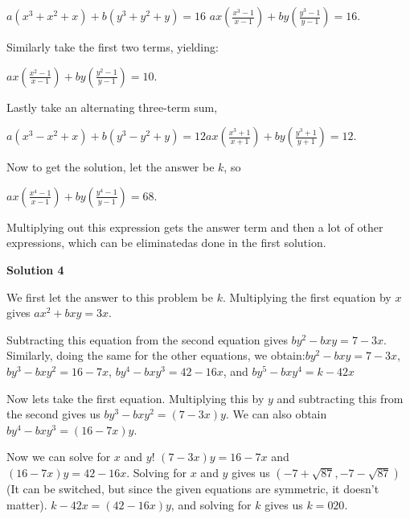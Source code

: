 \begin{enumerate}
 $a(x^3 + x^2 + x) + b(y^3 + y^2 + y) = 16$
$ax\left( \frac{x^3-1}{x-1} \right) + by\left( \frac{y^3-1}{y-1} \right) = 16$.

 Similarly take the first two terms, yielding:

 $ax \left( \frac{x^2-1}{x-1} \right) + by \left( \frac{y^2-1}{y-1} \right) = 10$.

 Lastly take an alternating three-term sum,

 $a(x^3 - x^2 + x) + b(y^3 - y^2 + y) = 12$$ax \left( \frac{x^3+1}{x+1} \right) + by \left( \frac{y^3+1}{y+1} \right) = 12$.

 Now to get the solution, let the answer be $k$, so 

 $ax \left( \frac{x^4-1}{x-1} \right) + by \left(\frac{y^4-1}{y-1} \right) = 68$.

 Multiplying out this expression gets the answer term and then a lot of other expressions, which can be eliminatedas done in the first solution.

 



\textbf{Solution 4}

We first let the answer to this problem be $k.$ Multiplying the first equation by $x$ gives $ax^2 + bxy=3x$.

 Subtracting this equation from the second equation gives $by^2-bxy=7-3x$. Similarly, doing the same for the other equations, we obtain:$by^2-bxy=7-3x$, $by^3-bxy^2=16-7x$, $by^4-bxy^3=42-16x$, and $by^5-bxy^4=k-42x$

 
Now lets take the first equation. Multiplying this by $y$ and subtracting this from the second gives us  $by^3-bxy^2=(7-3x)y$. We can also obtain  $by^4-bxy^3=(16-7x)y$. 

 Now we can solve for $x$ and $y$! $(7-3x)y = 16-7x$ and $(16-7x)y=42-16x$. Solving for $x$ and $y$ gives us $(-7+\sqrt{87},-7-\sqrt{87})$ (It can be switched, but since the given equations are symmetric, it doesn't matter). $k-42x= (42-16x)y$, and solving for $k$ gives us $k= \boxed{020}$.

 


\end{enumerate}